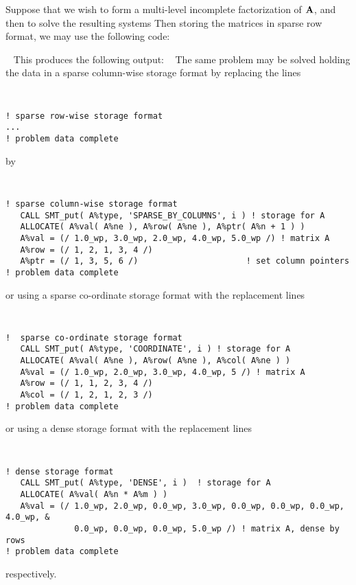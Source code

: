 \documentclass{galahad}
\begin{document}

\galexample
Suppose 
that we wish to form a multi-level incomplete factorization of ${\mathbf{A}}$,
and then to solve the resulting systems 
Then storing the matrices in sparse row format,
we may use the following code:

{\tt \small
\VerbatimInput{\packageexample}
}
\noindent
This produces the following output:
{\tt \small
\VerbatimInput{\packageresults}
}
\noindent
The same problem may be solved holding the data in 
a sparse column-wise storage format by replacing the lines
{\tt \small
\begin{verbatim}
! sparse row-wise storage format
...
! problem data complete   
\end{verbatim}
}
\noindent
by
{\tt \small
\begin{verbatim}
! sparse column-wise storage format
   CALL SMT_put( A%type, 'SPARSE_BY_COLUMNS', i ) ! storage for A
   ALLOCATE( A%val( A%ne ), A%row( A%ne ), A%ptr( A%n + 1 ) )
   A%val = (/ 1.0_wp, 3.0_wp, 2.0_wp, 4.0_wp, 5.0_wp /) ! matrix A
   A%row = (/ 1, 2, 1, 3, 4 /)
   A%ptr = (/ 1, 3, 5, 6 /)                      ! set column pointers  
! problem data complete   
\end{verbatim}
}
\noindent
or using a sparse co-ordinate storage format with the replacement lines
{\tt \small
\begin{verbatim}
!  sparse co-ordinate storage format
   CALL SMT_put( A%type, 'COORDINATE', i ) ! storage for A
   ALLOCATE( A%val( A%ne ), A%row( A%ne ), A%col( A%ne ) )
   A%val = (/ 1.0_wp, 2.0_wp, 3.0_wp, 4.0_wp, 5 /) ! matrix A
   A%row = (/ 1, 1, 2, 3, 4 /)
   A%col = (/ 1, 2, 1, 2, 3 /)
! problem data complete   
\end{verbatim}
}
\noindent
or using a dense storage format with the replacement lines
{\tt \small
\begin{verbatim}
! dense storage format
   CALL SMT_put( A%type, 'DENSE', i )  ! storage for A
   ALLOCATE( A%val( A%n * A%m ) )
   A%val = (/ 1.0_wp, 2.0_wp, 0.0_wp, 3.0_wp, 0.0_wp, 0.0_wp, 0.0_wp, 4.0_wp, &
              0.0_wp, 0.0_wp, 0.0_wp, 5.0_wp /) ! matrix A, dense by rows
! problem data complete   
\end{verbatim}
}
\noindent
respectively.
\end{document}
